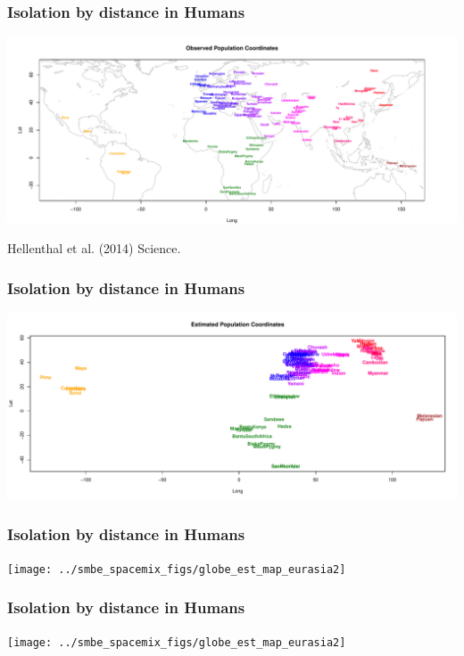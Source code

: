 \documentclass{beamer}
\begin{document}
\begin{frame}
\frametitle{Isolation by distance in Humans}
	\begin{center} \includegraphics[width=\textwidth]{../smbe_spacemix_figs/globe_obs_map_option2}
 \end{center}
     {\tiny Hellenthal et al. (2014) Science.}  
\end{frame}

\begin{frame}
\frametitle{Isolation by distance in Humans}
	\begin{center} \includegraphics[width=\textwidth]{../smbe_spacemix_figs/globe_est_map}
 \end{center}
\end{frame}

\begin{frame}
\frametitle{Isolation by distance in Humans}
	\begin{center} \texttt{[image: ../smbe\_spacemix\_figs/globe\_est\_map\_eurasia2]}
 \end{center}
\end{frame}

\begin{frame}
\frametitle{Isolation by distance in Humans}
	\begin{center} \texttt{[image: ../smbe\_spacemix\_figs/globe\_est\_map\_eurasia2]}
 \end{center}
\end{frame}
\end{document}

